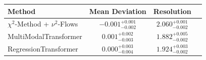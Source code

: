     \begin{tabular}{lccc}
        \toprule
        Method & Mean Deviation & Resolution \\
        \midrule
        $\chi^2$-Method + $\nu^2$-Flows & $-0.001_{-0.002}^{+0.001}$ & $2.060_{-0.002}^{+0.001}$ \\
        MultiModalTransformer & $0.001_{-0.003}^{+0.002}$ & $1.882_{-0.002}^{+0.005}$ \\
        RegressionTransformer & $0.000_{-0.004}^{+0.003}$ & $1.924_{-0.002}^{+0.003}$ \\
        \bottomrule
    \end{tabular}